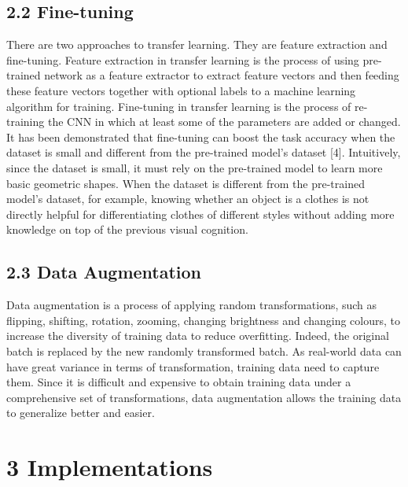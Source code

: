 \documentclass[11pt]{article}
\begin{document}
\subsection*{2.2 \hspace{10pt} Fine-tuning}
There are two approaches to transfer learning. They are feature extraction and fine-tuning.
Feature extraction in transfer learning is the process of using pre-trained network as a feature extractor to extract feature vectors and then feeding these feature vectors together with optional labels to a machine learning algorithm for training. Fine-tuning in transfer learning is the process of re-training the CNN in which at least some of the parameters are added or changed. It has been demonstrated that fine-tuning can boost the task accuracy when the dataset is small and different from the pre-trained model’s dataset [4]. Intuitively, since the dataset is small, it must rely on the pre-trained model to learn more basic geometric shapes. When the dataset is different from the pre-trained model's dataset, for example, knowing whether an object is a clothes is not directly helpful for differentiating clothes of different styles without adding more knowledge on top of the previous visual cognition.

\subsection*{2.3 \hspace{10pt} Data Augmentation}
Data augmentation is a process of applying random transformations, such as flipping, shifting, rotation, zooming, changing brightness and changing colours, to increase the diversity of training data to reduce overfitting. Indeed, the original batch is replaced by the new randomly transformed batch. As real-world data can have great variance in terms of transformation, training data need to capture them. Since it is difficult and expensive to obtain training data under a comprehensive set of transformations, data augmentation allows the training data to generalize better and easier.

\section*{\large{3 \hspace{10pt} Implementations}}
\end{document}

